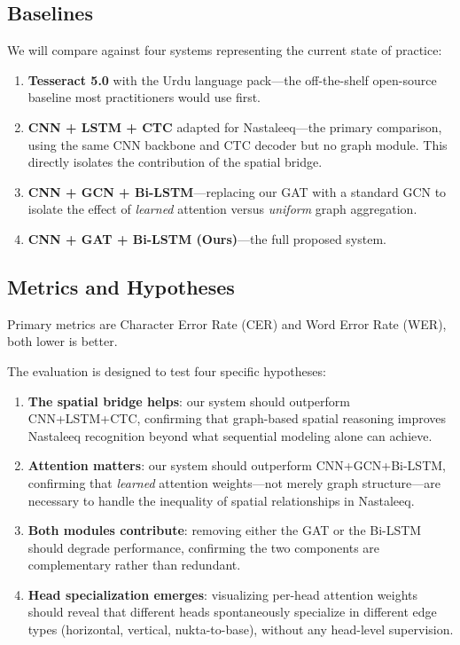 \documentclass[11pt]{article}
\begin{document}
\subsection{Baselines}

We will compare against four systems representing the current state of practice:

\begin{enumerate}[nosep]
  \item \textbf{Tesseract 5.0} \citep{Smith2007} with the Urdu language pack---the off-the-shelf
        open-source baseline most practitioners would use first.
  \item \textbf{CNN + LSTM + CTC} \citep{shi2017crnn} adapted for Nastaleeq---the
        primary comparison, using the same CNN backbone and CTC decoder but no graph
        module. This directly isolates the contribution of the spatial bridge.
  \item \textbf{CNN + GCN + Bi-LSTM}---replacing our GAT with a standard GCN
        \citep{kipf2017gcn} to isolate the effect of \emph{learned} attention versus
        \emph{uniform} graph aggregation.
  \item \textbf{CNN + GAT + Bi-LSTM (Ours)}---the full proposed system.
\end{enumerate}

\subsection{Metrics and Hypotheses}

Primary metrics are Character Error Rate (CER) and Word Error Rate (WER), both lower
is better.

The evaluation is designed to test four specific hypotheses:

\begin{enumerate}[nosep]
  \item \textbf{The spatial bridge helps}: our system should outperform CNN+LSTM+CTC,
        confirming that graph-based spatial reasoning improves Nastaleeq recognition
        beyond what sequential modeling alone can achieve.
  \item \textbf{Attention matters}: our system should outperform CNN+GCN+Bi-LSTM,
        confirming that \emph{learned} attention weights---not merely graph
        structure---are necessary to handle the inequality of spatial relationships in
        Nastaleeq.
  \item \textbf{Both modules contribute}: removing either the GAT or the Bi-LSTM should
        degrade performance, confirming the two components are complementary rather than
        redundant.
  \item \textbf{Head specialization emerges}: visualizing per-head attention weights
        should reveal that different heads spontaneously specialize in different edge
        types (horizontal, vertical, nukta-to-base), without any head-level supervision.
\end{enumerate}
\end{document}

